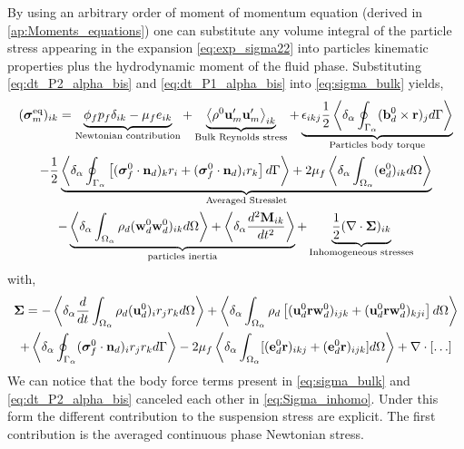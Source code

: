 By using an arbitrary order of moment of momentum equation (derived in \ref{ap:Moments_equations}) one can substitute any volume integral of the particle stress appearing in the expansion \ref{eq:exp_sigma22} into particles kinematic properties plus the hydrodynamic moment of the fluid phase. 
Substituting \ref{eq:dt_P2_alpha_bis} and \ref{eq:dt_P1_alpha_bis} into \ref{eq:sigma_bulk} yields, 
\begin{multline}
    (\bm{\sigma}^\text{eq}_m)_{ik}
    = 
    \underbrace{
        \phi_f p_f 
    \delta_{ik}
    - \mu_f e_{ik} 
    }_\text{Newtonian contribution}
    + \underbrace{\left<\rho^0 \textbf{u}'_m\textbf{u}'_m\right>_{ik}}_\text{Bulk Reynolds stress}
    + \underbrace{\epsilon_{ikj} \frac{1}{2}\left<\delta_\alpha \oint_{\Gamma_{\alpha}}  (\textbf{b}_d^0 \times \textbf{r})_j d\Gamma\right>}_\text{Particles body torque}\\
    - \frac{1}{2}\underbrace{\left<\delta_\alpha \oint_{\Gamma_{\alpha}} \left[
        (\bm{\sigma}_f^0 \cdot \textbf{n}_d)_kr_i  
        + (\bm{\sigma}_f^0 \cdot \textbf{n}_d)_i r_k
    \right] d\Gamma\right>
    + 2 \mu_f \left<\delta_\alpha \int_{\Omega_{\alpha}} (\textbf{e}_d^0)_{ik} d\Omega\right>}_\text{Averaged Stresslet}\\
    - \underbrace{\left<\delta_\alpha \int_{\Omega_{\alpha}}  \rho_d (\textbf{w}_d^0\textbf{w}_d^0  )_{ik} d\Omega\right>
    + \left<\delta_\alpha \frac{d^2 \textbf{M}_{ik}}{dt^2}  \right>}_\text{particles inertia}
    + \underbrace{\frac{1}{2} (\mathbf{\nabla}\cdot\bm{\Sigma})_{ik}}_\text{Inhomogeneous stresses}
    \label{eq:stress_bulk_explicit}
\end{multline}
with,
\begin{multline}
    \bm{\Sigma}
    = 
    - \left<\delta_\alpha \frac{d}{dt}\int_{\Omega_{\alpha}}  \rho_d (\textbf{u}_d^0)_i r_j r_k  d\Omega\right>
    + \left<\delta_\alpha \int_{\Omega_{\alpha}}  
        \rho_d \left[
        (\textbf{u}^0_d\textbf{r}\textbf{w}_d^0)_{ijk} +  (\textbf{u}^0_d\textbf{r}\textbf{w}_d^0)_{kji}
    \right]
     d\Omega\right>\\
    +\left<\delta_\alpha \oint_{\Gamma_{\alpha}}   (\bm{\sigma}_f^0 \cdot \textbf{n}_d)_i r_{j}  r_{k}   d\Gamma\right>
    - 2 \mu_f \left<\delta_\alpha \int_{\Omega_{\alpha}} [( \textbf{e}_d^0 \textbf{r})_{ikj}
    + ( \textbf{e}_d^0 \textbf{r})_{ijk}] d\Omega\right> + \mathbf{\nabla}\cdot[\ldots]
    \label{eq:Sigma_inhomo}
\end{multline}
We can notice that the body force terms present in \ref{eq:sigma_bulk} and \ref{eq:dt_P2_alpha_bis} canceled each other in \ref{eq:Sigma_inhomo}. 
Under this form the different contribution to the suspension stress are explicit. 
The first contribution is the averaged continuous phase Newtonian stress. 
